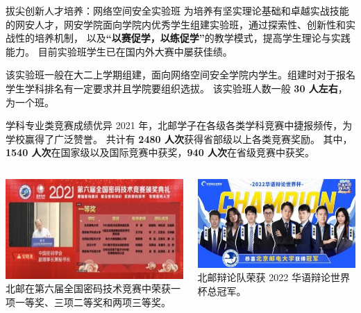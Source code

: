 \documentclass[aspectratio=169, utf8, fontset=windows]{beamer}
\begin{document}
\begin{frame}{拔尖创新人才培养：网络空间安全实验班}
    为培养有坚实理论基础和卓越实战技能的网安人才，网安学院面向学院内优秀学生组建实验班，通过探索性、创新性和实战性的培养机制，
    以及\textcolor{Fore}{\textbf{“以赛促学，以练促学”}}的教学模式，提高学生理论与实践能力。
    目前实验班学生已在国内外大赛中屡获佳绩。

    该实验班一般在大二上学期组建，面向网络空间安全学院内学生。组建时对于报名学生学科排名有一定要求并且学院要组织选拔。
    该实验班人数一般 \textcolor{Fore}{\textbf{30 人左右}}，为一个班。
\end{frame}

\begin{frame}{学科专业类竞赛成绩优异}
    2021 年，北邮学子在各级各类学科竞赛中捷报频传，为学校赢得了广泛赞誉。
    共计有 \textcolor{Fore}{\textbf{2480 人次}}获得省部级以上各类竞赛奖励。
    其中，\textcolor{Fore}{\textbf{1540 人次}}在国家级以及国际竞赛中获奖，\textcolor{Fore}{\textbf{940 人次}}在省级竞赛中获奖。\\[1em]

    \begin{columns}
        \scriptsize
        \includegraphics[width=\textwidth]{./resources/12.jpg}\\[0em]

        北邮在第六届全国密码技术竞赛中荣获一项一等奖、三项二等奖和两项三等奖。

        \scriptsize
        \includegraphics[width=\textwidth]{./resources/13.jpg}\\[0em]

        北邮辩论队荣获 2022 华语辩论世界杯总冠军。
    \end{columns}
\end{frame}
\end{document}
